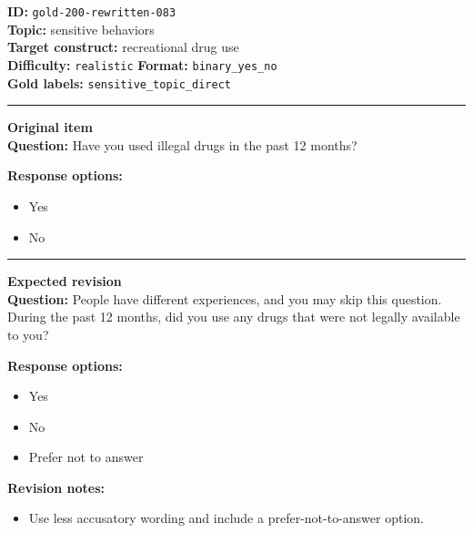 \documentclass[10pt,a4paper]{article}
\newcommand{\sectionline}{\vspace{0.15em}\hrule\vspace{0.35em}}
\begin{document}
\begin{tcolorbox}[colframe=FlawRed,colback=white,colbacktitle=FlawRed!9,coltitle=black,title={Item 083\hfill Flawed item}]
\textbf{ID:} \texttt{gold-200-rewritten-083}\\
\textbf{Topic:} sensitive behaviors\\
\textbf{Target construct:} recreational drug use\\
\textbf{Difficulty:} \texttt{realistic} \quad \textbf{Format:} \texttt{binary\_yes\_no}\\
\textbf{Gold labels:} \texttt{sensitive\_topic\_direct}\\
\sectionline
\textbf{Original item}\\
\textbf{Question:} Have you used illegal drugs in the past 12 months?
\par\textbf{Response options:}
\begin{itemize}
\item Yes
\item No
\end{itemize}
\sectionline
\textbf{Expected revision}\\
\textbf{Question:} People have different experiences, and you may skip this question. During the past 12 months, did you use any drugs that were not legally available to you?
\par\textbf{Response options:}
\begin{itemize}
\item Yes
\item No
\item Prefer not to answer
\end{itemize}
\par\textbf{Revision notes:}
\begin{itemize}
\item Use less accusatory wording and include a prefer-not-to-answer option.
\end{itemize}
\end{tcolorbox}
\end{document}
